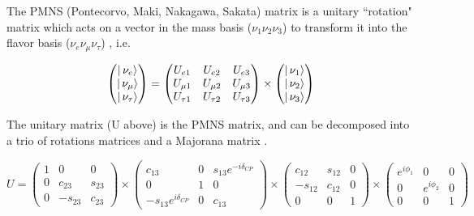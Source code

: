 The PMNS (Pontecorvo, Maki, Nakagawa, Sakata) matrix is a unitary ``rotation" matrix which acts on a vector in the mass basis ($\nu_{1} \nu_{2} \nu_{3}$) to transform it into the flavor basis  ($\nu_{e} \nu_{\mu} \nu_{\tau}$) , i.e.

\begin{equation}
 \left(\begin{matrix}
  \left | \, \nu_e \right \rangle \\ \left | \, \nu_{\mu} \right \rangle \\ \left | \, \nu_{\tau} \right \rangle
 \end{matrix}\right) =  
\left(\begin{matrix}
  U_{e1}& U_{e2} &U_{e3}\\ 
U_{\mu1} &U_{\mu2} &U_{\mu3}\\ 
U_{\tau1}& U_{\tau2}& U_{\tau3}\\ 
 \end{matrix} \right)
\times\left(
 \begin{matrix}
  \left | \, \nu_1 \right \rangle \\ \left | \, \nu_2 \right \rangle \\ \left | \, \nu_{3} \right \rangle
 \end{matrix}\right)
\end{equation}

The unitary matrix (U above) is the PMNS matrix,  and can be decomposed into a trio of rotations matrices and a Majorana matrix \cite {PMNSBreakdown}. 

\begin{equation}
 U=\left(\begin{matrix}
    1&0&0\\
0&c_{23}&s_{23}\\
0&-s_{23}&c_{23}
   \end{matrix}\right)
\times
\left(\begin{matrix}
    c_{13}&0&s_{13}e^{-i\delta_{CP}}\\
  0&1&0\\
-s_{13}e^{i\delta_{CP}}&0&c_{13}
   \end{matrix}\right)
\times
\left(\begin{matrix}
    c_{12}&s_{12}&0\\
-s_{12}&c_{12}&0\\
0&0&1
   \end{matrix}\right)
\times
\left(\begin{matrix}
    e^{i\phi_1} & 0 & 0 \\
0 & e^{i\phi_2} & 0 \\
0 & 0 & 1
   \end{matrix}\right)
\end{equation}

